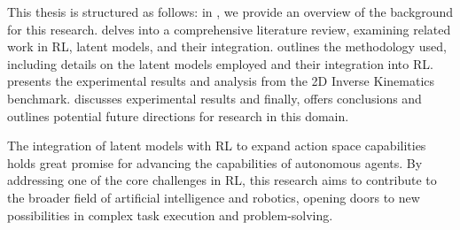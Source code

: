 This thesis is structured as follows: in , we provide an overview of the background for this research.  delves into a comprehensive literature review, examining related work in RL, latent models, and their integration.  outlines the methodology used, including details on the latent models employed and their integration into RL.  presents the experimental results and analysis from the 2D Inverse Kinematics benchmark.  discusses experimental results and finally,  offers conclusions and outlines potential future directions for research in this domain.

The integration of latent models with RL to expand action space capabilities holds great promise for advancing the capabilities of autonomous agents. By addressing one of the core challenges in RL, this research aims to contribute to the broader field of artificial intelligence and robotics, opening doors to new possibilities in complex task execution and problem-solving.




